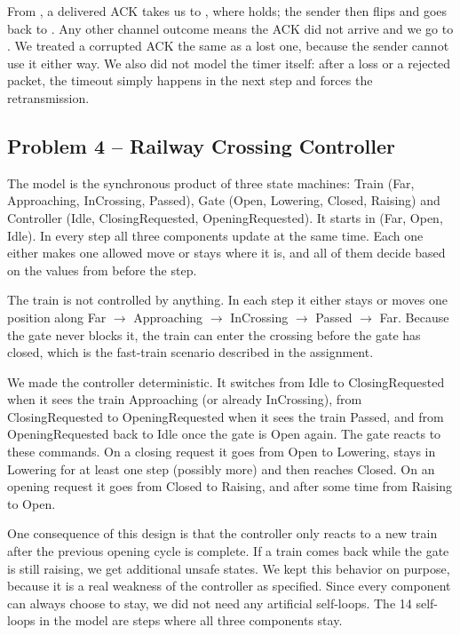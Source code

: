 \documentclass[11pt,a4paper]{article}
\DeclareRobustCommand{\code}{\codeurl}
\begin{document}
From \code{ack_sent}, a delivered ACK takes us to \code{ack_rcvd}, where
\code{ack_received} holds; the sender then flips \code{s_bit} and goes back to
\code{ready}. Any other channel outcome means the ACK did not arrive and we go
to \code{timeout}. We treated a corrupted ACK the same as a lost one, because
the sender cannot use it either way. We also did not model the timer itself:
after a loss or a rejected packet, the timeout simply happens in the next step
and forces the retransmission.

\subsection{Problem 4 -- Railway Crossing Controller}

The model is the synchronous product of three state machines: Train (Far,
Approaching, InCrossing, Passed), Gate (Open, Lowering, Closed, Raising) and
Controller (Idle, ClosingRequested, OpeningRequested). It starts in (Far,
Open, Idle). In every step all three components update at the same time. Each
one either makes one allowed move or stays where it is, and all of them decide
based on the values from before the step.

The train is not controlled by anything. In each step it either stays or
moves one position along Far $\to$ Approaching $\to$ InCrossing $\to$ Passed
$\to$ Far. Because the gate never blocks it, the train can enter the crossing
before the gate has closed, which is the fast-train scenario described in the
assignment.

We made the controller deterministic. It switches from Idle to
ClosingRequested when it sees the train Approaching (or already InCrossing),
from ClosingRequested to OpeningRequested when it sees the train Passed, and
from OpeningRequested back to Idle once the gate is Open again. The gate
reacts to these commands. On a closing request it goes from Open to Lowering,
stays in Lowering for at least one step (possibly more) and then reaches
Closed. On an opening request it goes from Closed to Raising, and after some
time from Raising to Open.

One consequence of this design is that the controller only reacts to a new
train after the previous opening cycle is complete. If a train comes back
while the gate is still raising, we get additional unsafe states. We kept this
behavior on purpose, because it is a real weakness of the controller as
specified. Since every component can always choose to stay, we did not need
any artificial self-loops. The 14 self-loops in the model are steps where all
three components stay.
\end{document}
